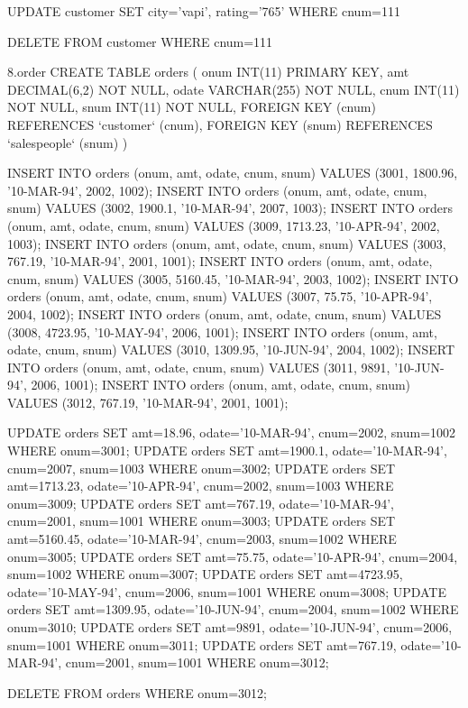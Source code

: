 UPDATE customer
SET city='vapi', rating='765'
WHERE cnum=111

DELETE FROM customer WHERE cnum=111



8.order
CREATE TABLE orders (
	onum INT(11) PRIMARY KEY,
    amt DECIMAL(6,2) NOT NULL,
    odate VARCHAR(255) NOT NULL,
   	cnum INT(11) NOT NULL,
    snum INT(11) NOT NULL,
    FOREIGN KEY (cnum) REFERENCES `customer` (cnum),
    FOREIGN KEY (snum) REFERENCES `salespeople` (snum)
)

INSERT INTO orders (onum, amt, odate, cnum, snum) VALUES (3001, 1800.96, '10-MAR-94', 2002, 1002);
INSERT INTO orders (onum, amt, odate, cnum, snum) VALUES (3002, 1900.1, '10-MAR-94', 2007, 1003);
INSERT INTO orders (onum, amt, odate, cnum, snum) VALUES (3009, 1713.23, '10-APR-94', 2002, 1003);
INSERT INTO orders (onum, amt, odate, cnum, snum) VALUES (3003, 767.19, '10-MAR-94', 2001, 1001);
INSERT INTO orders (onum, amt, odate, cnum, snum) VALUES (3005, 5160.45, '10-MAR-94', 2003, 1002);
INSERT INTO orders (onum, amt, odate, cnum, snum) VALUES (3007, 75.75, '10-APR-94', 2004, 1002);
INSERT INTO orders (onum, amt, odate, cnum, snum) VALUES (3008, 4723.95, '10-MAY-94', 2006, 1001);
INSERT INTO orders (onum, amt, odate, cnum, snum) VALUES (3010, 1309.95, '10-JUN-94', 2004, 1002);
INSERT INTO orders (onum, amt, odate, cnum, snum) VALUES (3011, 9891, '10-JUN-94', 2006, 1001);
INSERT INTO orders (onum, amt, odate, cnum, snum) VALUES (3012, 767.19, '10-MAR-94', 2001, 1001);


UPDATE orders
SET amt=18.96, odate='10-MAR-94', cnum=2002, snum=1002
WHERE onum=3001;
UPDATE orders
SET amt=1900.1, odate='10-MAR-94', cnum=2007, snum=1003
WHERE onum=3002;
UPDATE orders
SET amt=1713.23, odate='10-APR-94', cnum=2002, snum=1003
WHERE onum=3009;
UPDATE orders
SET amt=767.19, odate='10-MAR-94', cnum=2001, snum=1001
WHERE onum=3003;
UPDATE orders
SET amt=5160.45, odate='10-MAR-94', cnum=2003, snum=1002
WHERE onum=3005;
UPDATE orders
SET amt=75.75, odate='10-APR-94', cnum=2004, snum=1002
WHERE onum=3007;
UPDATE orders
SET amt=4723.95, odate='10-MAY-94', cnum=2006, snum=1001
WHERE onum=3008;
UPDATE orders
SET amt=1309.95, odate='10-JUN-94', cnum=2004, snum=1002
WHERE onum=3010;
UPDATE orders
SET amt=9891, odate='10-JUN-94', cnum=2006, snum=1001
WHERE onum=3011;
UPDATE orders
SET amt=767.19, odate='10-MAR-94', cnum=2001, snum=1001
WHERE onum=3012;


DELETE FROM orders WHERE onum=3012;












